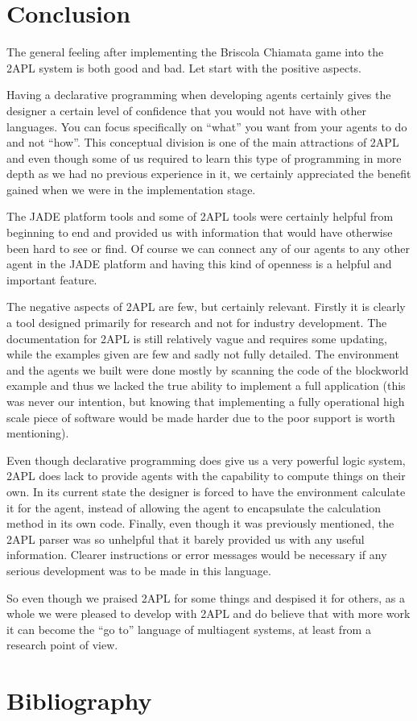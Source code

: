 \documentclass[a4paper]{article}
\begin{document}
\section{Conclusion}\label{sec:concl} 

The general feeling after implementing the Briscola Chiamata game into the 2APL system is both good and bad. Let start with the positive aspects.

Having a declarative programming when developing agents certainly gives the designer a certain level of confidence that you would not have with other languages. You can focus specifically on ``what'' you want from your agents to do and not ``how''. This conceptual division is one of the main attractions of 2APL and even though some of us required to learn this type of programming in more depth as we had no previous experience in it, we certainly appreciated the benefit gained when we were in the implementation stage.

The JADE platform tools and some of 2APL tools were certainly helpful from beginning to end and provided us with information that would have otherwise been hard to see or find. Of course we can connect any of our agents to any other agent in the JADE platform and having this kind of openness is a helpful and important feature.

The negative aspects of 2APL are few, but certainly relevant. Firstly it is clearly a tool designed primarily for research and not for industry development. The documentation for 2APL is still relatively vague and requires some updating, while the examples given are few and sadly not fully detailed. The environment and the agents we built were done mostly by scanning the code of the blockworld example and thus we lacked the true ability to implement a full application (this was never our intention, but knowing that implementing a fully operational high scale piece of software would be made harder due to the poor support is worth mentioning).

Even though declarative programming does give us a very powerful logic system, 2APL does lack to provide agents with the capability to compute things on their own. In its current state the designer is forced to have the environment calculate it for the agent, instead of allowing the agent to encapsulate the calculation method in its own code. Finally, even though it was previously mentioned, the 2APL parser was so unhelpful that it barely provided us with any useful information. Clearer instructions or error messages would be necessary if any serious development was to be made in this language.

So even though we praised 2APL for some things and despised it for others, as a whole we were pleased to develop with 2APL and do believe that with more work it can become the ``go to'' language of multiagent systems, at least from a research point of view.


\section{Bibliography}
\nocite{*}


\end{document}
